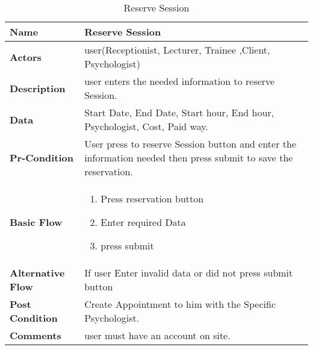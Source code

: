 \documentclass[../Psychological_system_web_application.tex]{subfiles}
\begin{document}
	\begin{center}
		\begin{table}[h]
			\begin{tabular}{ | m{4cm} | m{10cm}| } 
				\hline
			 	\textbf{\large Name}& Reserve Session\\ 
				\hline
			  	\textbf{\large Actors}& user(Receptionist, Lecturer, Trainee ,Client, Psychologist)\\ 
				\hline
			  	\textbf{\large Description}& user enters the needed information to reserve Session.\\ 
				\hline
				\textbf{\large Data}& Start Date, End Date, Start hour, End hour, Psychologist, Cost, Paid way.\\ 
				\hline
				 \textbf{\large Pr-Condition}& User press to reserve Session button and enter the information needed then press submit to save the reservation. \\ 
				\hline
				\textbf{\large Basic Flow}&\begin{enumerate}
				\item
					Press reservation button 
				\item
					Enter required Data
				\item 
					press submit \end{enumerate}\\
					\hline
				\textbf{\large Alternative Flow}& If user Enter invalid data or did not press submit button\\ 
				\hline
				\textbf{\large Post Condition}& Create Appointment to him with the Specific Psychologist.\\ 
				\hline
				\textbf{\large Comments}& user must have an account on site.\\ 
				\hline
			\end{tabular}
			\caption{Reserve Session}
			\label{table:RESERVE-SESSION}
		\end{table}
	\end{center}
\end{document}
